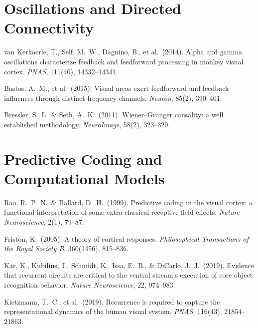 \documentclass[11pt,a4paper]{report}
\begin{document}
\section*{Oscillations and Directed Connectivity}
\begin{enumerate}[label={[\arabic*]}, leftmargin=2.5em, start=13]
  \item van Kerkoerle, T., Self, M.\ W., Dagnino, B., et al.\ (2014). Alpha and gamma oscillations characterize feedback and feedforward processing in monkey visual cortex. \textit{PNAS}, 111(40), 14332--14341.
  \item Bastos, A.\ M., et al.\ (2015). Visual areas exert feedforward and feedback influences through distinct frequency channels. \textit{Neuron}, 85(2), 390--401.
  \item Bressler, S.\ L.\ \& Seth, A.\ K.\ (2011). Wiener--Granger causality: a well established methodology. \textit{NeuroImage}, 58(2), 323--329.
\end{enumerate}

\section*{Predictive Coding and Computational Models}
\begin{enumerate}[label={[\arabic*]}, leftmargin=2.5em, start=16]
  \item Rao, R.\ P.\ N.\ \& Ballard, D.\ H.\ (1999). Predictive coding in the visual cortex: a functional interpretation of some extra-classical receptive-field effects. \textit{Nature Neuroscience}, 2(1), 79--87.
  \item Friston, K.\ (2005). A theory of cortical responses. \textit{Philosophical Transactions of the Royal Society B}, 360(1456), 815--836.
  \item Kar, K., Kubilius, J., Schmidt, K., Issa, E.\ B., \& DiCarlo, J.\ J.\ (2019). Evidence that recurrent circuits are critical to the ventral stream's execution of core object recognition behavior. \textit{Nature Neuroscience}, 22, 974--983.
  \item Kietzmann, T.\ C., et al.\ (2019). Recurrence is required to capture the representational dynamics of the human visual system. \textit{PNAS}, 116(43), 21854--21863.
\end{enumerate}
\end{document}
